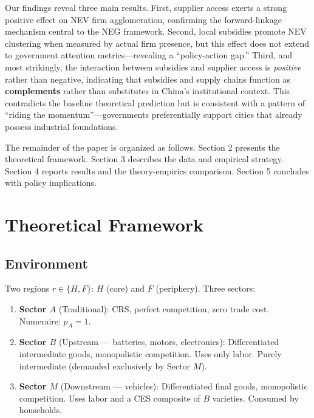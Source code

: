\documentclass[11pt,a4paper]{article}
\begin{document}
Our findings reveal three main results. First, supplier access exerts a strong positive effect on NEV firm agglomeration, confirming the forward-linkage mechanism central to the NEG framework. Second, local subsidies promote NEV clustering when measured by actual firm presence, but this effect does not extend to government attention metrics---revealing a ``policy-action gap.'' Third, and most strikingly, the interaction between subsidies and supplier access is \textit{positive} rather than negative, indicating that subsidies and supply chains function as \textbf{complements} rather than substitutes in China's institutional context. This contradicts the baseline theoretical prediction but is consistent with a pattern of ``riding the momentum''---governments preferentially support cities that already possess industrial foundations.

The remainder of the paper is organized as follows. Section 2 presents the theoretical framework. Section 3 describes the data and empirical strategy. Section 4 reports results and the theory-empirics comparison. Section 5 concludes with policy implications.

\section{Theoretical Framework}

\subsection{Environment}

Two regions $r \in \{H,F\}$: $H$ (core) and $F$ (periphery). Three sectors:
\begin{enumerate}[label=(\alph*)]
    \item \textbf{Sector $A$} (Traditional): CRS, perfect competition, zero trade cost. Numeraire: $p_A=1$.
    \item \textbf{Sector $B$} (Upstream --- batteries, motors, electronics): Differentiated intermediate goods, monopolistic competition. Uses only labor. Purely intermediate (demanded exclusively by Sector $M$).
    \item \textbf{Sector $M$} (Downstream --- vehicles): Differentiated final goods, monopolistic competition. Uses labor and a CES composite of $B$ varieties. Consumed by households.
\end{enumerate}
\end{document}
